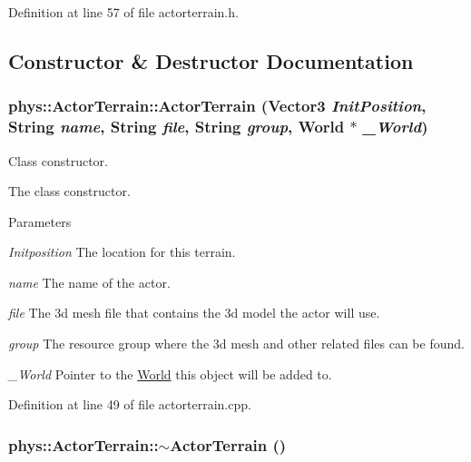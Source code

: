 Definition at line 57 of file actorterrain.h.



\subsection{Constructor \& Destructor Documentation}
\hypertarget{classphys_1_1ActorTerrain_a9f4f3381dcca132d7c699176fe4dfc5c}{
\subsubsection[{ActorTerrain}]{\setlength{\rightskip}{0pt plus 5cm}phys::ActorTerrain::ActorTerrain ({\bf Vector3} {\em InitPosition}, \/  {\bf String} {\em name}, \/  {\bf String} {\em file}, \/  {\bf String} {\em group}, \/  {\bf World} $\ast$ {\em \_\-World})}}
\label{de/d74/classphys_1_1ActorTerrain_a9f4f3381dcca132d7c699176fe4dfc5c}


Class constructor. 

The class constructor. 
\begin{DoxyParams}{Parameters}
\item[{\em Initposition}]The location for this terrain. \item[{\em name}]The name of the actor. \item[{\em file}]The 3d mesh file that contains the 3d model the actor will use. \item[{\em group}]The resource group where the 3d mesh and other related files can be found. \item[{\em \_\-World}]Pointer to the \hyperlink{classphys_1_1World}{World} this object will be added to. \end{DoxyParams}


Definition at line 49 of file actorterrain.cpp.

\hypertarget{classphys_1_1ActorTerrain_af6ef2e3694b7afe0b59cfa0909c0490c}{
\subsubsection[{$\sim$ActorTerrain}]{\setlength{\rightskip}{0pt plus 5cm}phys::ActorTerrain::$\sim$ActorTerrain ()}}
\label{de/d74/classphys_1_1ActorTerrain_af6ef2e3694b7afe0b59cfa0909c0490c}



